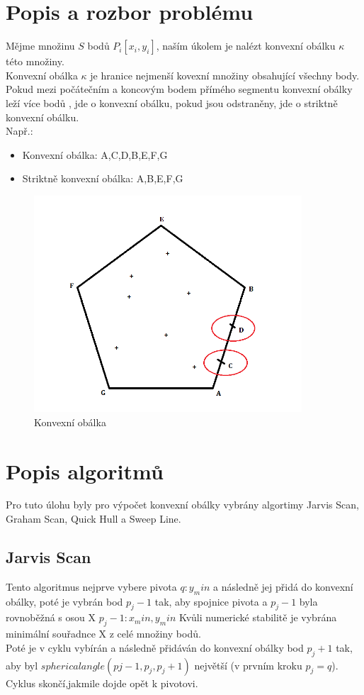 \documentclass[a4paper, 12pt]{article}
\begin{document}
\clearpage

\section{Popis a rozbor problému}

Mějme množinu $S$ bodů $P_i [x_i, y_i]$, naším úkolem je nalézt konvexní obálku $\kappa$ této množiny.\\
  
Konvexní obálka $\kappa$ je hranice nejmenší kovexní množiny obsahující všechny body. \\
Pokud mezi počátečním a koncovým bodem přímého segmentu konvexní obálky leží více bodů , jde o konvexní obálku, pokud jsou odstraněny, jde o striktně konvexní obálku. \\
Např.:
\begin{itemize}
\item Konvexní obálka: A,C,D,B,E,F,G
\item Striktně konvexní obálka: A,B,E,F,G
\end{itemize}
\begin{figure}[h]
	\centering
	\includegraphics[width=10cm]{KO.png}
	\caption{Konvexní obálka}
\end{figure}


\clearpage
\section{Popis algoritmů}

Pro tuto úlohu byly pro výpočet konvexní obálky vybrány algortimy Jarvis Scan, Graham Scan, Quick Hull a Sweep Line.\\

\subsection{Jarvis Scan}
Tento algoritmus nejprve vybere pivota $q: y_min$ a následně jej přidá do konvexní obálky, poté je vybrán bod $p_j-1$ tak, aby spojnice pivota a $p_j-1$ byla rovnoběžná s osou X $p_j-1: x_min, y_min$ Kvůli numerické stabilitě je vybrána minimální souřadnce X z celé množiny bodů. \\
Poté je v cyklu vybírán a následně přidáván do konvexní obálky bod $p_j+1$ tak, aby byl $sphericalangle (pj-1, p_j, p_j+1)$ největší (v prvním kroku $p_j = q$). Cyklus skončí,jakmile dojde opět k pivotovi.
\vspace{1.5cm}
\end{document}
